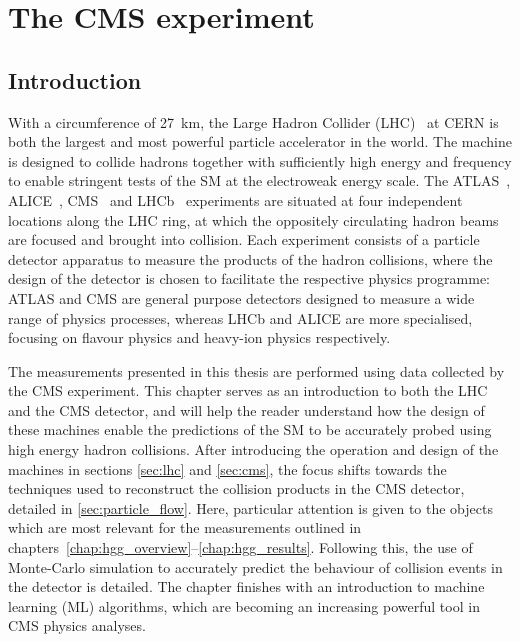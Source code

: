 \chapter{The CMS experiment}
\label{chap:cms}

\section{Introduction}
With a circumference of 27~km, the Large Hadron Collider (LHC)~\cite{1748-0221-3-08-S08001} at CERN is both the largest and most powerful particle accelerator in the world. The machine is designed to collide hadrons together with sufficiently high energy and frequency to enable stringent tests of the SM at the electroweak energy scale. The ATLAS~\cite{Aad:2008zzm}, ALICE~\cite{Aamodt:2008zz}, CMS~\cite{Chatrchyan:2008zzk} and LHCb~\cite{Alves:2008zz} experiments are situated at four independent locations along the LHC ring, at which the oppositely circulating hadron beams are focused and brought into collision. Each experiment consists of a particle detector apparatus to measure the products of the hadron collisions, where the design of the detector is chosen to facilitate the respective physics programme: ATLAS and CMS are general purpose detectors designed to measure a wide range of physics processes, whereas LHCb and ALICE are more specialised, focusing on flavour physics and heavy-ion physics respectively. 

The measurements presented in this thesis are performed using data collected by the CMS experiment. This chapter serves as an introduction to both the LHC and the CMS detector, and will help the reader understand how the design of these machines enable the predictions of the SM to be accurately probed using high energy hadron collisions. After introducing the operation and design of the machines in sections \ref{sec:lhc} and \ref{sec:cms}, the focus shifts towards the techniques used to reconstruct the collision products in the CMS detector, detailed in \ref{sec:particle_flow}. Here, particular attention is given to the objects which are most relevant for the \Hgg measurements outlined in chapters~\ref{chap:hgg_overview}--\ref{chap:hgg_results}. Following this, the use of Monte-Carlo simulation to accurately predict the behaviour of collision events in the detector is detailed. The chapter finishes with an introduction to machine learning (ML) algorithms, which are becoming an increasing powerful tool in CMS physics analyses.

